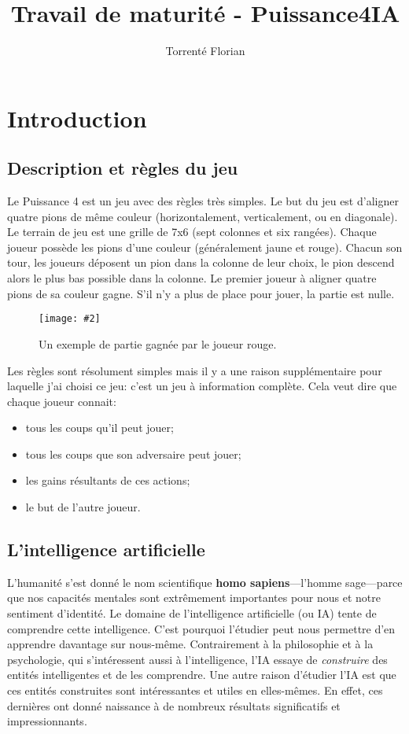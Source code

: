 \documentclass[a4paper]{article}
\author{Torrenté Florian}
\title{Travail de maturité - Puissance4IA}
\newcommand{\img}[3][]{
    \begin{figure}[H]
        \centering
        \texttt{[image: \#2]}
        \caption{#1}    
    \end{figure}
}
\begin{document}
\maketitle

\tableofcontents

\newpage
\section{Introduction}

\subsection{Description et règles du jeu}
    Le Puissance 4 est un jeu avec des règles très simples. Le but du jeu est d'aligner quatre pions de même couleur (horizontalement, verticalement, ou en diagonale). Le terrain de jeu est une grille de 7x6 (sept colonnes et six rangées). Chaque joueur possède les pions d'une couleur (généralement jaune et rouge). Chacun son tour, les joueurs déposent un pion dans la colonne de leur choix, le pion descend alors le plus bas possible dans la colonne. Le premier joueur à aligner quatre pions de sa couleur gagne. S'il n'y a plus de place pour jouer, la partie est nulle.


    \img[Un exemple de partie gagnée par le joueur rouge.]{Images/puissance4.jpg}{0.5}

    Les règles sont résolument simples mais il y a une raison supplémentaire pour laquelle j'ai choisi ce jeu: c'est un jeu à information complète. Cela veut dire que chaque joueur connait: \begin{itemize}
        \item tous les coups qu'il peut jouer;
        \item tous les coups que son adversaire peut jouer;
        \item les gains résultants de ces actions;
        \item le but de l'autre joueur.
    \end{itemize}

\subsection{L'intelligence artificielle}
    L'humanité s'est donné le nom scientifique \textbf{homo sapiens}---l'homme sage---parce que nos capacités mentales sont extrêmement importantes pour nous et notre sentiment d'identité. Le domaine de l'intelligence artificielle (ou IA) tente de comprendre cette intelligence. C'est pourquoi l'étudier peut nous permettre d'en apprendre davantage sur nous-même. Contrairement à la philosophie et à la psychologie, qui s'intéressent aussi à l'intelligence, l'IA essaye de \textit{construire} des entités intelligentes et de les comprendre. Une autre raison d'étudier l'IA est que ces entités construites sont intéressantes et utiles en elles-mêmes. En effet, ces dernières ont donné naissance à de nombreux résultats significatifs et impressionnants.
\end{document}
